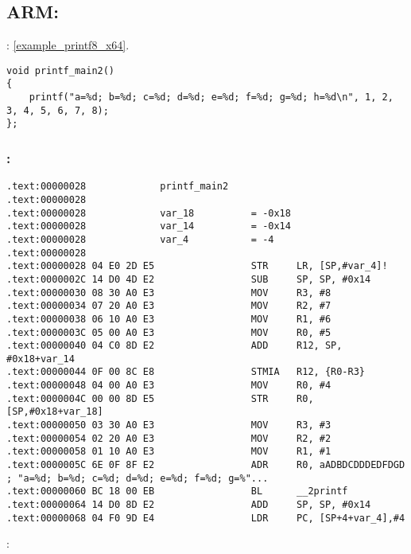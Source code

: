 \subsection{ARM: }

: \ref{example_printf8_x64}.

\begin{lstlisting}
void printf_main2()
{
	printf("a=%d; b=%d; c=%d; d=%d; e=%d; f=%d; g=%d; h=%d\n", 1, 2, 3, 4, 5, 6, 7, 8);
};
\end{lstlisting}

\subsubsection{\OptimizingKeil: \ARMMode}

\begin{lstlisting}
.text:00000028             printf_main2
.text:00000028
.text:00000028             var_18          = -0x18
.text:00000028             var_14          = -0x14
.text:00000028             var_4           = -4
.text:00000028
.text:00000028 04 E0 2D E5                 STR     LR, [SP,#var_4]!
.text:0000002C 14 D0 4D E2                 SUB     SP, SP, #0x14
.text:00000030 08 30 A0 E3                 MOV     R3, #8
.text:00000034 07 20 A0 E3                 MOV     R2, #7
.text:00000038 06 10 A0 E3                 MOV     R1, #6
.text:0000003C 05 00 A0 E3                 MOV     R0, #5
.text:00000040 04 C0 8D E2                 ADD     R12, SP, #0x18+var_14
.text:00000044 0F 00 8C E8                 STMIA   R12, {R0-R3}
.text:00000048 04 00 A0 E3                 MOV     R0, #4
.text:0000004C 00 00 8D E5                 STR     R0, [SP,#0x18+var_18]
.text:00000050 03 30 A0 E3                 MOV     R3, #3
.text:00000054 02 20 A0 E3                 MOV     R2, #2
.text:00000058 01 10 A0 E3                 MOV     R1, #1
.text:0000005C 6E 0F 8F E2                 ADR     R0, aADBDCDDDEDFDGD ; "a=%d; b=%d; c=%d; d=%d; e=%d; f=%d; g=%"...
.text:00000060 BC 18 00 EB                 BL      __2printf
.text:00000064 14 D0 8D E2                 ADD     SP, SP, #0x14
.text:00000068 04 F0 9D E4                 LDR     PC, [SP+4+var_4],#4
\end{lstlisting}

:

